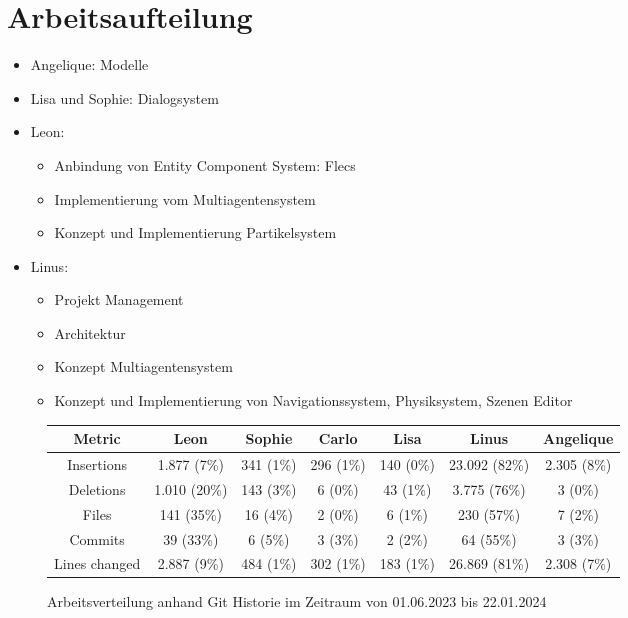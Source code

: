 

\section{Arbeitsaufteilung}

\begin{itemize}
\item Angelique: Modelle
\item Lisa und Sophie: Dialogsystem
\item Leon:
\begin{itemize}
\item Anbindung von Entity Component System: Flecs
\item Implementierung vom Multiagentensystem
\item Konzept und Implementierung Partikelsystem
\end{itemize}
\item Linus:
\begin{itemize}
\item Projekt Management
\item Architektur
\item Konzept Multiagentensystem
\item Konzept und Implementierung von Navigationssystem, Physiksystem, Szenen Editor
\end{itemize}
\end{itemize}

\begin{figure}[h!]
\begin{tabular}{|c|c|c|c|c|c|c|}
\hline
Metric        & Leon         & Sophie    & Carlo     & Lisa      & Linus         & Angelique \\
\hline
Insertions    & 1.877 (7\%)  & 341 (1\%) & 296 (1\%) & 140 (0\%) & 23.092 (82\%) & 2.305 (8\%) \\
\hline
Deletions     & 1.010 (20\%) & 143 (3\%) & 6 (0\%)   & 43 (1\%)  & 3.775 (76\%)  & 3 (0\%) \\
\hline
Files         & 141 (35\%)   & 16 (4\%)  & 2 (0\%)   & 6 (1\%)   & 230 (57\%)    & 7 (2\%) \\
\hline
Commits       & 39 (33\%)    & 6 (5\%)   & 3 (3\%)   & 2 (2\%)   & 64 (55\%)     & 3 (3\%) \\
\hline
Lines changed & 2.887 (9\%)  & 484 (1\%) & 302 (1\%) & 183 (1\%) & 26.869 (81\%) & 2.308 (7\%) \\
\hline
\end{tabular}
\caption{Arbeitsverteilung anhand Git Historie im Zeitraum von 01.06.2023 bis 22.01.2024 \cite{gitquickstats}}
\label{arbeitsaufteilung}
\end{figure}